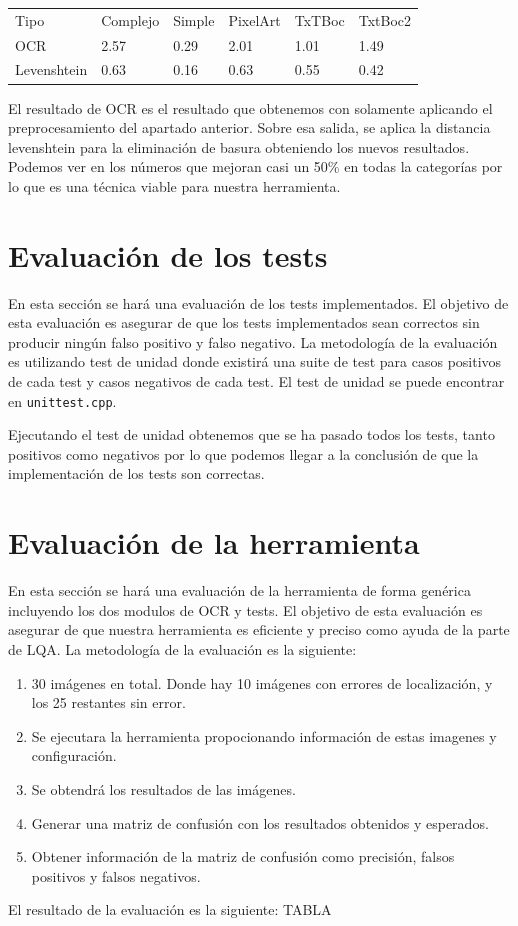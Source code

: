 \begin{table}[H]
\begin{tabular}{llllll}
Tipo        & Complejo & Simple & PixelArt & TxTBoc & TxtBoc2                      \\
OCR         & 2.57     & 0.29   & 2.01     & 1.01   & \cellcolor[HTML]{FFFFFF}1.49 \\
Levenshtein & 0.63     & 0.16   & 0.63     & 0.55   & 0.42                        
\end{tabular}
\end{table}
El resultado de OCR es el resultado que obtenemos con solamente aplicando el preprocesamiento del apartado anterior. Sobre esa salida, se aplica la distancia levenshtein para la eliminación de basura obteniendo los nuevos resultados. Podemos ver en los números que mejoran casi un 50\% en todas la categorías por lo que es una técnica viable para nuestra herramienta.
\section{Evaluación de los tests}
En esta sección se hará una evaluación de los tests implementados.
El objetivo de esta evaluación es asegurar de que los tests implementados sean correctos sin producir ningún falso positivo y falso negativo.
La metodología de la evaluación es utilizando test de unidad donde existirá una suite de test para casos positivos de cada test y casos negativos de cada test. El test de unidad se puede encontrar en \texttt{unittest.cpp}.

Ejecutando el test de unidad obtenemos que se ha pasado todos los tests, tanto positivos como negativos por lo que podemos llegar a la conclusión de que la implementación de los tests son correctas.

\section{Evaluación de la herramienta}
En esta sección se hará una evaluación de la herramienta de forma genérica incluyendo los dos modulos de OCR y tests.
El objetivo de esta evaluación es asegurar de que nuestra herramienta es eficiente y preciso como ayuda de la parte de LQA.
La metodología de la evaluación es la siguiente:
\begin{enumerate}
	\item 30 imágenes en total. Donde hay 10 imágenes con errores de localización, y los 25 restantes sin error.
	\item Se ejecutara la herramienta propocionando información de estas imagenes y configuración.
	\item Se obtendrá los resultados de las imágenes.
	\item Generar una matriz de confusión con los resultados obtenidos y esperados.
	\item Obtener información de la matriz de confusión como precisión, falsos positivos y falsos negativos.
\end{enumerate}
El resultado de la evaluación es la siguiente:
TABLA
